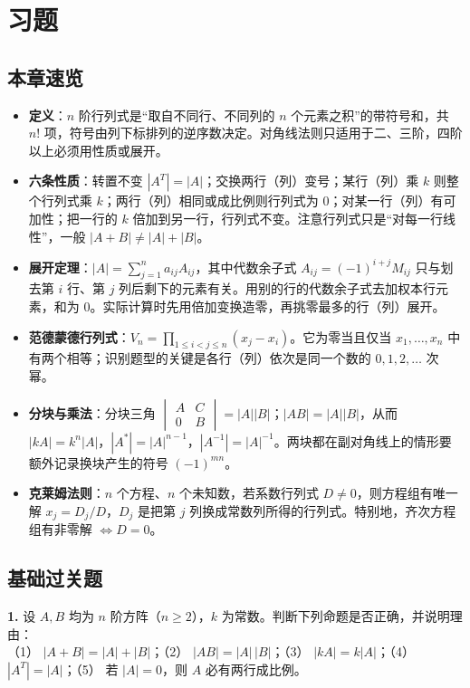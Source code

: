 \section{习题}

\subsection{本章速览}

\begin{itemize}[leftmargin=1.6em]
  \item \textbf{定义}：$n$ 阶行列式是“取自不同行、不同列的 $n$ 个元素之积”的带符号和，共 $n!$ 项，符号由列下标排列的逆序数决定。对角线法则只适用于二、三阶，四阶以上必须用性质或展开。
  \item \textbf{六条性质}：转置不变 $|A^{T}|=|A|$；交换两行（列）变号；某行（列）乘 $k$ 则整个行列式乘 $k$；两行（列）相同或成比例则行列式为 $0$；对某一行（列）有可加性；把一行的 $k$ 倍加到另一行，行列式不变。注意行列式只是“对每一行线性”，一般 $|A+B|\neq|A|+|B|$。
  \item \textbf{展开定理}：$|A|=\sum_{j=1}^{n}a_{ij}A_{ij}$，其中代数余子式 $A_{ij}=(-1)^{i+j}M_{ij}$ 只与划去第 $i$ 行、第 $j$ 列后剩下的元素有关。用别的行的代数余子式去加权本行元素，和为 $0$。实际计算时先用倍加变换造零，再挑零最多的行（列）展开。
  \item \textbf{范德蒙德行列式}：$V_n=\prod_{1\le i<j\le n}(x_j-x_i)$。它为零当且仅当 $x_1,\dots,x_n$ 中有两个相等；识别题型的关键是各行（列）依次是同一个数的 $0,1,2,\dots$ 次幂。
  \item \textbf{分块与乘法}：分块三角 $\begin{vmatrix}A&C\\0&B\end{vmatrix}=|A||B|$；$|AB|=|A||B|$，从而 $|kA|=k^{n}|A|$，$|A^{*}|=|A|^{n-1}$，$|A^{-1}|=|A|^{-1}$。两块都在副对角线上的情形要额外记录换块产生的符号 $(-1)^{mn}$。
  \item \textbf{克莱姆法则}：$n$ 个方程、$n$ 个未知数，若系数行列式 $D\neq0$，则方程组有唯一解 $x_j=D_j/D$，$D_j$ 是把第 $j$ 列换成常数列所得的行列式。特别地，齐次方程组有非零解 $\iff D=0$。
\end{itemize}

\subsection{基础过关题}

\textbf{1.} 设 $A,B$ 均为 $n$ 阶方阵（$n\ge 2$），$k$ 为常数。判断下列命题是否正确，并说明理由：\\
（1） $|A+B|=|A|+|B|$；\quad （2） $|AB|=|A|\,|B|$；\quad （3） $|kA|=k|A|$；\quad （4） $|A^{T}|=|A|$；\quad （5） 若 $|A|=0$，则 $A$ 必有两行成比例。


